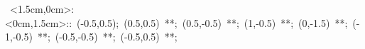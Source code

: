 \hbox{
\xy    <1.5cm,0cm>:<0cm,1.5cm>::
       (-0.5,0.5); (0.5,0.5) **\dir{-};
       (0.5,-0.5) **\dir{-}; (1,-0.5) **\dir{-}; (0,-1.5) **\dir{-};
       (-1,-0.5) **\dir{-}; (-0.5,-0.5) **\dir{-}; (-0.5,0.5) **\dir{-};
\endxy}

